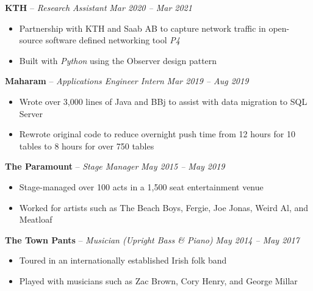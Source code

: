 \documentclass[10pt,letterpaper]{article}
\begin{document}

\headedsection
{\textbf{KTH} -- \textit{Research Assistant}}
{\textit{Mar 2020 -- Mar 2021}} {
	\begin{itemize}[noitemsep,nolistsep]
		\item Partnership with KTH and Saab AB to capture network traffic in open-source software defined networking tool \textit{P4}
		\item Built with \textit{Python} using the Observer design pattern
	\end{itemize}
}
\vspace{-1mm}

\headedsection
{\textbf{Maharam} -- \textit{Applications Engineer Intern}}
{\textit{Mar 2019 -- Aug 2019}} {
	\begin{itemize}[noitemsep,nolistsep]
		\item Wrote over 3,000 lines of Java and BBj to assist with data migration to SQL Server
		\item Rewrote original code to reduce overnight push time from 12 hours for 10 tables to 8 hours for over 750 tables
	\end{itemize}
}
\vspace{-1mm}


\headedsection
{\textbf{The Paramount} -- \textit{Stage Manager}}
{\textit{May 2015 -- May 2019}} {
	\begin{itemize}[noitemsep,nolistsep]
		\item Stage-managed over 100 acts in a 1,500 seat entertainment venue
		\item Worked for artists such as The Beach Boys, Fergie, Joe Jonas, Weird Al, and Meatloaf
	\end{itemize}
}
\vspace{-1mm}


\headedsection
{\textbf{The Town Pants} -- \textit{Musician (Upright Bass \& Piano)}}
{\textit{May 2014 -- May 2017}} {
	\begin{itemize}[noitemsep,nolistsep]
		\item Toured in an internationally established Irish folk band
		\item Played with musicians such as Zac Brown, Cory Henry, and George Millar
	\end{itemize}
}
\end{document}
